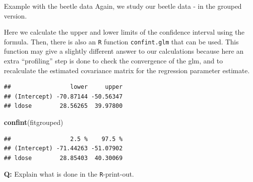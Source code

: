 \documentclass[
  ignorenonframetext,
]{beamer}
\newenvironment{Shaded}{\begin{snugshade}}{\end{snugshade}}
\newcommand{\AttributeTok}[1]{\textcolor[rgb]{0.13,0.29,0.53}{#1}}
\newcommand{\DecValTok}[1]{\textcolor[rgb]{0.00,0.00,0.81}{#1}}
\newcommand{\FloatTok}[1]{\textcolor[rgb]{0.00,0.00,0.81}{#1}}
\newcommand{\FunctionTok}[1]{\textcolor[rgb]{0.13,0.29,0.53}{\textbf{#1}}}
\newcommand{\NormalTok}[1]{#1}
\newcommand{\OtherTok}[1]{\textcolor[rgb]{0.56,0.35,0.01}{#1}}
\newcommand{\SpecialCharTok}[1]{\textcolor[rgb]{0.81,0.36,0.00}{\textbf{#1}}}
\newcommand{\StringTok}[1]{\textcolor[rgb]{0.31,0.60,0.02}{#1}}
\begin{document}
\begin{frame}[fragile]
\begin{block}{Example with the beetle data}
\protect\hypertarget{example-with-the-beetle-data}{}
Again, we study our beetle data - in the grouped version.

Here we calculate the upper and lower limits of the confidence interval
using the formula. Then, there is also an \texttt{R} function
\texttt{confint.glm} that can be used. This function may give a slightly
different answer to our calculations because here an extra ``profiling''
step is done to check the convergence of the glm, and to recalculate the
estimated covariance matrix for the regression parameter estimate.

\begin{Shaded}
\end{Shaded}

\begin{verbatim}
##                 lower     upper
## (Intercept) -70.87144 -50.56347
## ldose        28.56265  39.97800
\end{verbatim}

\begin{Shaded}
\begin{Highlighting}[]
\FunctionTok{confint}\NormalTok{(fitgrouped)}
\end{Highlighting}
\end{Shaded}

\begin{verbatim}
##                 2.5 %    97.5 %
## (Intercept) -71.44263 -51.07902
## ldose        28.85403  40.30069
\end{verbatim}

\textbf{Q:} Explain what is done in the \texttt{R}-print-out.
\end{block}
\end{frame}
\end{document}

